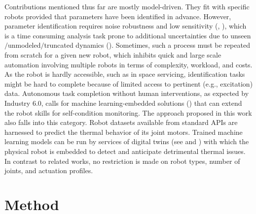 \documentclass{ifacconf}
\begin{document}
Contributions mentioned thus far are mostly model-driven. They fit  with specific robots provided that parameters have been  identified in advance. However, parameter identification requires   noise robustness and low  sensitivity (\cite{zhang2024model}, \cite{de2024non}), which is a time consuming analysis task  prone to additional uncertainties due to unseen$\slash$unmodeled$\slash$truncated dynamics (\cite{shang2024general}). Sometimes, such a process must  be repeated from scratch for a given new robot, which inhibits quick and large scale automation involving multiple robots in terms of complexity, workload, and costs. As the robot is hardly accessible, such as in space servicing,  identification tasks might be hard to complete because of limited access to pertinent (e.g., excitation) data. Autonomous task completion without human interventions, as expected by Industry 6.0, calls for machine learning-embedded solutions (\cite{carayannis2024toward}) that can extend the robot skills for self-condition monitoring. The approach proposed in this work also falls into this category. Robot datasets available from standard APIs are harnessed to predict the thermal behavior of its joint motors. Trained machine learning models can be run by  services of  digital twins (see \cite{kaigom2023metarobotics} and \cite{kaigom2020value}) with which the physical robot is embedded to detect and anticipate  detrimental thermal issues. In contrast to related works, no restriction is made  on  robot types, {number of joints, and actuation profiles.}


\section{Method}
\end{document}
